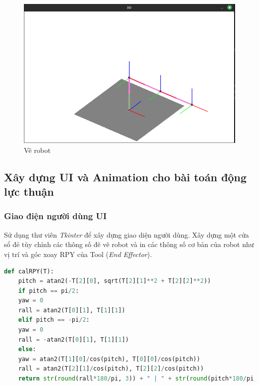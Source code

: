 \begin{figure}[H]
	\centering
	\includegraphics[width=1\linewidth]{Images/draw_bot.png}
	\caption{Vẽ robot}
	\label{fig:enter-label4}
\end{figure}

\subsection{Xây dựng UI và Animation cho bài toán động lực thuận}
\subsubsection{Giao điện người dùng UI}

Sử dụng thư viên \textit{Tkinter} để xây dựng giao diện người dùng. Xây dựng một cửa sổ đẻ tùy chỉnh các thông số đẽ vẽ robot và in các thông số cơ bản của robot như vị trí và góc xoay RPY của Tool (\textit{End Effector}).

\vspace{0.5cm}
\begin{lstlisting}[language=python]
	def calRPY(T):
	pitch = atan2(-T[2][0], sqrt(T[2][1]**2 + T[2][2]**2))
	if pitch == pi/2:
	yaw = 0
	rall = atan2(T[0][1], T[1][1])
	elif pitch == -pi/2:
	yaw = 0
	rall = -atan2(T[0][1], T[1][1])
	else:
	yaw = atan2(T[1][0]/cos(pitch), T[0][0]/cos(pitch))
	rall = atan2(T[2][1]/cos(pitch), T[2][2]/cos(pitch))
	return str(round(rall*180/pi, 3)) + " | " + str(round(pitch*180/pi, 3)) + " | " + str(round(yaw*180/pi, 3))
\end{lstlisting}

